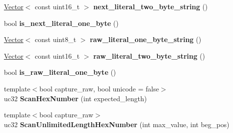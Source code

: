 \begin{DoxyCompactItemize}
\item 
\hyperlink{classv8_1_1internal_1_1_vector}{Vector}$<$ const uint16\+\_\+t $>$ {\bfseries next\+\_\+literal\+\_\+two\+\_\+byte\+\_\+string} ()\hypertarget{classv8_1_1internal_1_1_scanner_a1ab3ae386a6ba2e5c2560741045b8e44}{}\label{classv8_1_1internal_1_1_scanner_a1ab3ae386a6ba2e5c2560741045b8e44}

\item 
bool {\bfseries is\+\_\+next\+\_\+literal\+\_\+one\+\_\+byte} ()\hypertarget{classv8_1_1internal_1_1_scanner_a4bc18718e8eabd5b702d06aaf97af054}{}\label{classv8_1_1internal_1_1_scanner_a4bc18718e8eabd5b702d06aaf97af054}

\item 
\hyperlink{classv8_1_1internal_1_1_vector}{Vector}$<$ const uint8\+\_\+t $>$ {\bfseries raw\+\_\+literal\+\_\+one\+\_\+byte\+\_\+string} ()\hypertarget{classv8_1_1internal_1_1_scanner_a38d57dd64444a652574638926bda7342}{}\label{classv8_1_1internal_1_1_scanner_a38d57dd64444a652574638926bda7342}

\item 
\hyperlink{classv8_1_1internal_1_1_vector}{Vector}$<$ const uint16\+\_\+t $>$ {\bfseries raw\+\_\+literal\+\_\+two\+\_\+byte\+\_\+string} ()\hypertarget{classv8_1_1internal_1_1_scanner_ad9a6b936b9d7e55da078476eaf6e74c7}{}\label{classv8_1_1internal_1_1_scanner_ad9a6b936b9d7e55da078476eaf6e74c7}

\item 
bool {\bfseries is\+\_\+raw\+\_\+literal\+\_\+one\+\_\+byte} ()\hypertarget{classv8_1_1internal_1_1_scanner_a0b4d05972bd86cc6acc1d7fe09316aaf}{}\label{classv8_1_1internal_1_1_scanner_a0b4d05972bd86cc6acc1d7fe09316aaf}

\item 
{\footnotesize template$<$bool capture\+\_\+raw, bool unicode = false$>$ }\\uc32 {\bfseries Scan\+Hex\+Number} (int expected\+\_\+length)\hypertarget{classv8_1_1internal_1_1_scanner_af9ea2c0c035e31d692a7c9b822a04597}{}\label{classv8_1_1internal_1_1_scanner_af9ea2c0c035e31d692a7c9b822a04597}

\item 
{\footnotesize template$<$bool capture\+\_\+raw$>$ }\\uc32 {\bfseries Scan\+Unlimited\+Length\+Hex\+Number} (int max\+\_\+value, int beg\+\_\+pos)\hypertarget{classv8_1_1internal_1_1_scanner_a63a729503a3adbe2b228a45b86fa3c30}{}\label{classv8_1_1internal_1_1_scanner_a63a729503a3adbe2b228a45b86fa3c30}


\end{DoxyCompactItemize}
